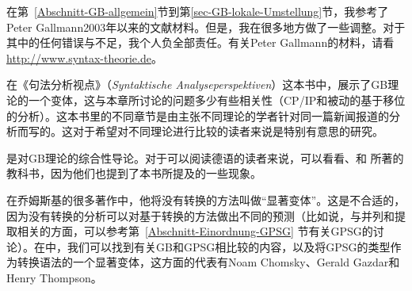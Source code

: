 在第~\ref{Abschnitt-GB-allgemein}节到第\ref{sec-GB-lokale-Umstellung}节，我参考了Peter Gallmann2003年以来的文献材料。但是，我在很多地方做了一些调整。对于其中的任何错误与不足，我个人负全部责任。有关Peter Gallmann的材料，请看\url{http://www.syntax-theorie.de}。

在《句法分析视点》（\emph{Syntaktische Analyseperspektiven}）这本书中，\citet{Lohnstein2014a}展示了GB理论的一个变体，这与本章所讨论的问题多少有些相关性（CP/IP和被动的基于移位的分析）。这本书里的不同章节是由主张不同理论的学者针对同一篇新闻报道的分析而写的。这对于希望对不同理论进行比较的读者来说是特别有意思的研究。

是对GB理论的综合性导论。对于可以阅读德语的读者来说，可以看看、和 所著的教科书，因为他们也提到了本书所提及的一些现象。

在乔姆斯基的很多著作中，他将没有转换的方法叫做“显著变体”。这是不合适的，因为没有转换的分析可以对基于转换的方法做出不同的预测（比如说，与并列和提取相关的方面，可以参考第~\ref{Abschnitt-Einordnung-GPSG} 节有关GPSG的讨论）。在中，我们可以找到有关GB和GPSG相比较的内容，以及将GPSG的类型作为转换语法的一个显著变体，这方面的代表有Noam Chomsky、Gerald Gazdar和Henry Thompson。


